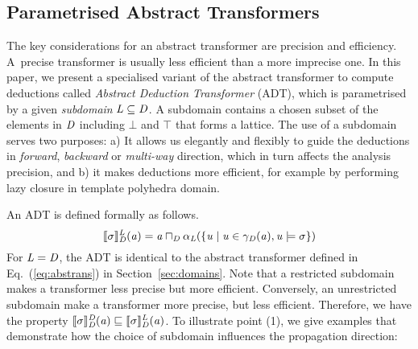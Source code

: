 \subsection{Parametrised Abstract Transformers} \label{sec:abst}

The key considerations for an abstract transformer are precision and
efficiency.  A~precise transformer is usually less efficient than a more
imprecise one.  In this paper, we present a specialised variant of the
abstract transformer to compute deductions called \emph{Abstract Deduction
Transformer} (ADT), which is parametrised by a given \emph{subdomain}
$\mathit{L}\subseteq \mathit{D}$.
%
A subdomain contains a chosen subset of the elements in $\mathit{D}$ including
$\bot$ and $\top$ that forms a lattice.
%
The use of a subdomain serves two purposes:
  a) It allows us elegantly and flexibly to guide the deductions in 
  {\em forward}, {\em backward} or {\em multi-way} direction, which 
  in turn affects the analysis precision, and 
  b) it makes deductions more efficient, for example by performing lazy closure
  in template polyhedra domain. 
%



An ADT is defined formally  as follows. 
\begin{equation}\label{eq:at2}
\llbracket \sigma \rrbracket_{\mathit{D}}^{\mathit{L}}(\mathit{a})=\mathit{a}\sqcap_{\mathit{D}} \alpha_{\mathit{L}}(\{\mathit{u}\mid \mathit{u}\in\gamma_{\mathit{D}}(\mathit{a}), \mathit{u}\models \sigma\})
\end{equation}
For $\mathit{L}=\mathit{D}$, the ADT is
identical to the abstract transformer defined in
Eq.~(\ref{eq:abstrans}) in Section~\ref{sec:domains}.  Note 
that a restricted subdomain makes a transformer less 
precise but more efficient.  Conversely, an
unrestricted subdomain make a transformer more precise, but less
efficient. Therefore, we have the property
$\llbracket \sigma \rrbracket_{\mathit{D}}^{\mathit{D}}(\mathit{a})\sqsubseteq
\llbracket \sigma \rrbracket_{\mathit{D}}^{\mathit{L}}(\mathit{a})$.
%
To illustrate point (1), 
we give examples that demonstrate how the choice of
subdomain influences the propagation direction:

